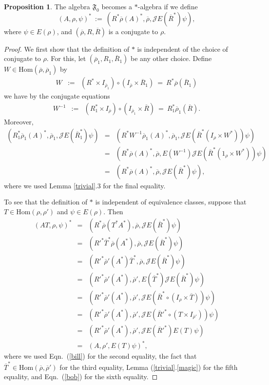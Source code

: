 \documentclass[12pt]{article}
\newcommand{\alg}[1]{\mathfrak{#1}}
\theoremstyle{definition}
\newtheorem{prop}[thm]{Proposition}
\theoremstyle{definition}
\theoremstyle{remark}
\def\2#1{{\mathcal #1}}
\def\ol#1{{\overline #1}}
\newcommand{\Hom}{\mathrm{Hom}}
\begin{document}
\begin{prop} \label{prop-starF}
The algebra $\alg{F}_0 $ becomes a $*$-algebra if we define
  \begin{equation} (A,\rho ,\psi )^* \: := \: (R^*\overline{\rho}(A)^*,\ol\rho
    ,\2JE(\overline{R}^*)\psi ) ,\end{equation} where $\psi \in E(\rho )$, and
  $(\overline{\rho},R,\overline{R})$ is a conjugate to $\rho$.
\end{prop}

\begin{proof} We first show that the definition of $*$ is independent of the choice
  of conjugate to $\rho$.  For this, let $(\overline{\rho}_1,R_1,\overline{R}_1)$ be
  any other choice.  Define $W\in \Hom (\ol\rho ,\ol\rho _1)$ by
  \begin{eqnarray} W &:=& (R^*\times I_{\overline{\rho} _1})\circ
    (I_{\overline{\rho}}\times \ol R_1) \: =\: R^*\overline{\rho}(\ol R_1)
  \end{eqnarray} we have by the conjugate equations
\begin{eqnarray*}
  W^{-1} & := & (R_1^*\times I_{\ol\rho}) \circ (I_{\ol\rho_1}\times \ol R) \:
  =\: R_1^*\ol\rho_1 (\ol R) .\end{eqnarray*} Moreover,
\begin{eqnarray*}
  (R_1^*\ol\rho _1(A)^*,\ol\rho _1,\2JE(\ol R_1^*)\psi ) &=& (R^*W^{-1}\ol\rho
  _1(A)^*,\ol\rho _1,\2JE(\ol
  R^*(I_{\rho}\times W^*))\psi )   \\ 
  &=&   (R^*\ol\rho (A)^*,\ol\rho ,E(W^{-1})\2JE(\ol R^*(1_{\rho}\times W^*))\psi ) \\
  &=& (R^*\ol\rho (A)^*,\ol\rho ,\2JE(\ol R^*)\psi ),\end{eqnarray*}
where we used Lemma \ref{trivial}.3 for the final equality.  

To see that the definition of $*$ is independent of equivalence classes, suppose that
$T\in \Hom (\rho ,\rho ')$ and $\psi \in E(\rho )$.  Then
\begin{eqnarray*} (AT,\rho ,\psi )^* &=& (R^*\ol\rho (T^*A^*),\ol\rho ,\2JE(\ol R^*)\psi ) \\
  &=& (R'^*\ol T^*\ol\rho (A^*),\ol\rho ,\2JE(\ol R^*)\psi ) \\
  &=& (R'^*\ol\rho '(A^*)\ol T^*,\ol\rho ,\2JE(\ol R^*)\psi ) \\
  &=& (R'^*\ol\rho '(A^*),\ol\rho ',E(\ol T^*)\2JE(\ol R^*)\psi ) \\
  &=& (R'^*\ol\rho '(A^*),\ol\rho ',\2JE(\ol R^*\circ (I_{\rho }\times \ol T))\psi )\\
  &=& (R'^*\ol\rho '(A^*),\ol\rho ',\2JE(\ol R'^*\circ (T\times I_{\ol\rho '}))\psi ) \\
  &=& (R'^*\ol\rho '(A^*),\ol\rho ',\2JE(\ol R'^*)E(T)\psi ) \\
  &=& (A,\rho ',E(T)\psi )^* , \end{eqnarray*} where we used Eqn.\ (\ref{bill}) for the
second equality, the fact that $\ol{T}^*\in \Hom (\ol\rho ,\ol\rho ')$ for the third
equality, Lemma (\ref{trivial}.\ref{magic}) for the fifth equality, and Eqn.\ (\ref{bob})
for the sixth equality.


\end{proof}
\end{document}
